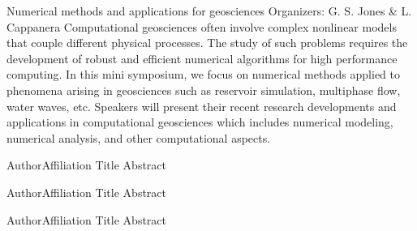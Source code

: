 \label{mini03}

\miniabs
{Numerical methods and applications for geosciences}
{Organizers: G. S. Jones \& L. Cappanera}
{Computational geosciences often involve complex nonlinear models that couple different physical processes. The study of such problems requires the development of robust and efficient numerical algorithms for high performance computing. In this mini symposium, we focus on numerical methods applied to phenomena arising in geosciences such as reservoir simulation, multiphase flow, water waves, etc. Speakers will present their recent research developments and applications in computational geosciences which includes numerical modeling, numerical analysis, and other computational aspects.}
\vspace{2ex}



\abs
{Author}{Affiliation}
{Title}
{Abstract
}

\vspace{1.5ex}

\abs
{Author}{Affiliation}
{Title}
{Abstract
}

\vspace{1.5ex}

\abs
{Author}{Affiliation}
{Title}
{Abstract
}
